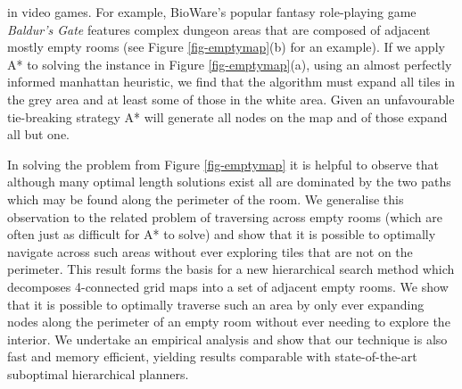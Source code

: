 in video games.
For example, BioWare's popular fantasy role-playing game \emph{Baldur's Gate} features complex dungeon
 areas that are composed of adjacent mostly empty rooms (see Figure \ref{fig-emptymap}(b) for an example).
If we apply A* \cite{hart68} to solving the instance in Figure \ref{fig-emptymap}(a), using an almost 
perfectly informed manhattan heuristic, we find that the algorithm must expand all tiles in the grey 
area and at least some of those in the white area.
Given an unfavourable tie-breaking strategy A* will generate all nodes on the map and of those expand 
all but one.
\par
In solving the problem from Figure \ref{fig-emptymap} it is helpful to observe that although many optimal 
length solutions exist all are dominated by the two paths which may be found along the perimeter of 
the room. 
We generalise this observation to the related problem of traversing across empty rooms (which are 
often just as difficult for A* to solve) and show that it is possible to optimally navigate across 
such areas without ever exploring tiles that are not on the perimeter.
This result forms the basis for a new hierarchical search method which decomposes 4-connected grid maps
into a set of adjacent empty rooms. 
We show that it is possible to optimally traverse such an area by only ever expanding nodes along the
perimeter of an empty room without ever needing to explore the interior.
We undertake an empirical analysis and show that our technique is also fast and memory efficient,
yielding results comparable with state-of-the-art suboptimal hierarchical planners.
